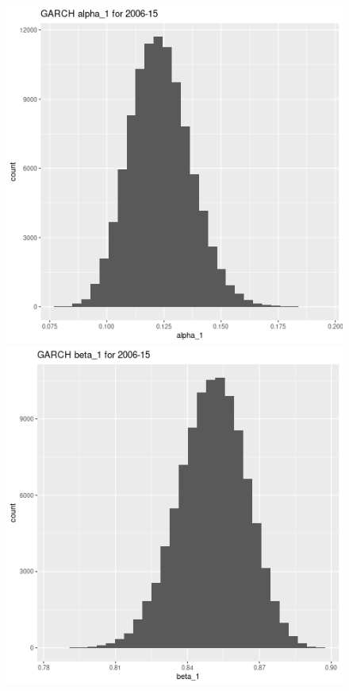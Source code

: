 \documentclass[12pt,letterpaper,reqno,fleqn]{article}
\begin{document}
\begin{figure}
\includegraphics[scale = .4]{ga10615}
\includegraphics[scale = .4]{gb10615}

\end{figure}
\end{document}
